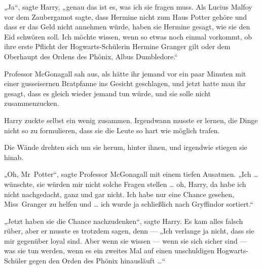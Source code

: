 „Ja“, sagte Harry, „genau das ist es, was ich sie fragen muss. Als Lucius Malfoy vor dem Zaubergamot sagte, dass Hermine nicht zum Haus Potter gehöre und dass er das Geld nicht annehmen würde, haben sie Hermine gesagt, wie sie den Eid schwören soll. Ich möchte wissen, wenn so etwas noch einmal vorkommt, ob ihre erste Pflicht der Hogwarts-Schülerin Hermine Granger gilt oder dem Oberhaupt des Ordens des Phönix, Albus Dumbledore.“

Professor McGonagall sah aus, als hätte ihr jemand vor ein paar Minuten mit einer gusseisernen Bratpfanne ins Gesicht geschlagen, und jetzt hatte man ihr gesagt, dass es gleich wieder jemand tun würde, und sie solle nicht zusammenzucken.

Harry zuckte selbst ein wenig zusammen. Irgendwann musste er lernen, die Dinge nicht so zu formulieren, dass sie die Leute so hart wie möglich trafen.

Die Wände drehten sich um sie herum, hinter ihnen, und irgendwie stiegen sie hinab.

„Oh, Mr~Potter“, sagte Professor McGonagall mit einem tiefen Ausatmen.
„Ich … wünschte, sie würden mir nicht solche Fragen stellen … oh, Harry, da habe ich nicht nachgedacht, ganz und gar nicht. Ich habe nur eine Chance gesehen, Miss~Granger zu helfen und … ich wurde ja schließlich nach Gryffindor sortiert.“

„Jetzt haben sie die Chance nachzudenken“, sagte Harry. Es kam alles falsch rüber, aber er musste es trotzdem sagen, denn —
„Ich verlange ja nicht, dass sie mir gegenüber loyal sind. Aber wenn sie wissen — wenn sie sich sicher sind — was sie tun werden, wenn es ein zweites Mal auf einen unschuldigen Hogwarts-Schüler gegen den Orden des Phönix hinausläuft …“

